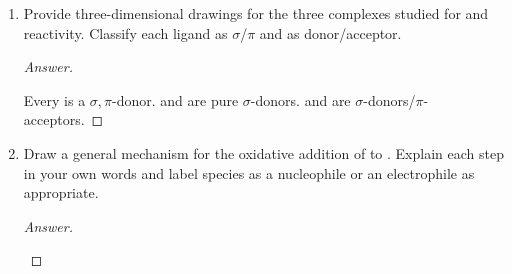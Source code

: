 \documentclass[../psets.tex]{subfiles}
\begin{document}
\begin{enumerate}
    \begin{enumerate}
        \item Provide three-dimensional drawings for the three  complexes studied for  and  reactivity. Classify each ligand as $\sigma$/$\pi$ and as donor/acceptor.
        \begin{proof}[Answer]
            ${\color{white}hi}$
            \begin{figure}[H]
                \centering
                \begin{subfigure}[b]{0.3\linewidth}
                    \centering
                \end{subfigure}
                \begin{subfigure}[b]{0.3\linewidth}
                    \centering
                \end{subfigure}
                \begin{subfigure}[b]{0.3\linewidth}
                    \centering
                \end{subfigure}
            \end{figure}
            Every  is a $\sigma,\pi$-donor.  and  are pure $\sigma$-donors.  and  are $\sigma$-donors/$\pi$-acceptors.
        \end{proof}
        \newpage
        \item Draw a general mechanism for the oxidative addition of  to . Explain each step in your own words and label species as a nucleophile or an electrophile as appropriate.
        \begin{proof}[Answer]
            ${\color{white}hi}$
            \begin{center}
\end{center}
\end{proof}
\end{enumerate}
\end{enumerate}
\end{document}
